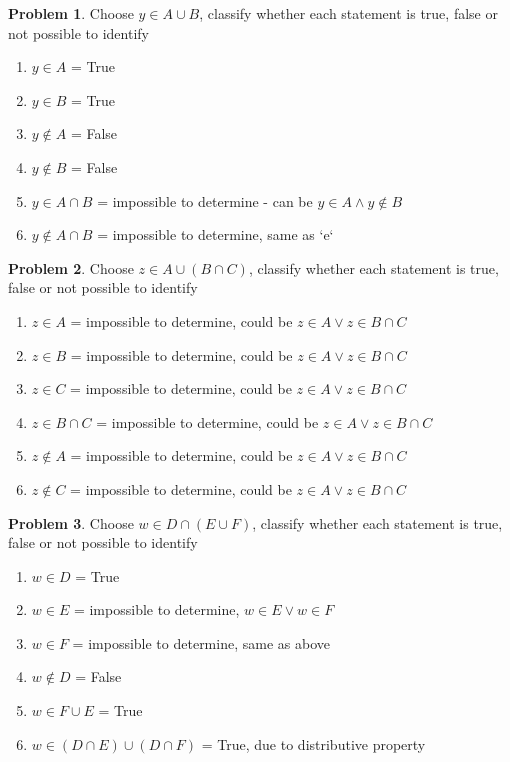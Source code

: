 \documentclass{article}
\theoremstyle{definition}
\newtheorem{problem}{Problem}[section]
\begin{document}
\begin{problem}
    Choose $y \in A \cup B$, classify whether each statement is true, false or not possible to identify

    \begin{enumerate}[label=(\alph*)]
        \item \(y \in A\) = True
        \item \(y \in B\) = True
        \item \(y \notin A\) = False
        \item \(y \notin B\) = False
        \item \(y \in A \cap B\) = impossible to determine - can be $y \in A \land y \notin B$
        \item \(y \notin A \cap B\) = impossible to determine, same as `e`
    \end{enumerate}
\end{problem}

\begin{problem}
Choose $z \in A \cup (B \cap C) $, classify whether each statement is true, false or not possible to identify

    \begin{enumerate}[label=(\alph*)]
        \item \(z \in A\) = impossible to determine, could be $z \in A \lor z \in B \cap C$
        \item \(z \in B\) = impossible to determine, could be $z \in A \lor z \in B \cap C$
        \item \(z \in C\) = impossible to determine, could be $z \in A \lor z \in B \cap C$
        \item \(z \in B \cap C\) = impossible to determine, could be $z \in A \lor z \in B \cap C$
        \item \(z \notin A\) = impossible to determine, could be $z \in A \lor z \in B \cap C$
        \item \(z \notin C\) = impossible to determine, could be $z \in A \lor z \in B \cap C$
    \end{enumerate}
\end{problem}


\begin{problem}
Choose $w \in D \cap (E \cup F) $, classify whether each statement is true, false or not possible to identify

    \begin{enumerate}[label=(\alph*)]
        \item \(w \in D\) = True
        \item \(w \in E\) = impossible to determine, $w \in E \lor w \in F$
        \item \(w \in F\) = impossible to determine, same as above
        \item \(w \notin D\) = False
        \item \(w \in F \cup E\) = True
        \item \(w \in (D \cap E) \cup (D \cap F)\) = True, due to distributive property
    \end{enumerate}
\end{problem}
\end{document}
